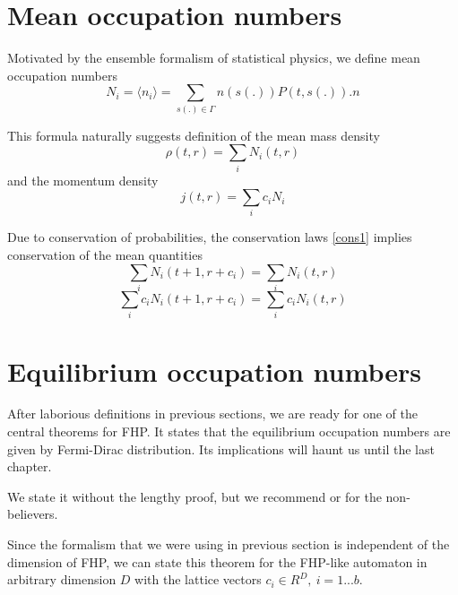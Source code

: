 \section{Mean occupation numbers}
Motivated by the ensemble formalism of statistical physics, we define mean occupation numbers
\begin{equation*}
N_i = \langle n_i \rangle = \sum_{s(.) \in \Gamma} n(s(.)) P(t,s(.)) .n
\end{equation*}

This formula naturally suggests definition of the mean mass density
\begin{equation*}
\rho(t,r) = \sum_i N_i(t,r)
\end{equation*}
and the momentum density
\begin{equation*}
j(t,r) = \sum_i c_i N_i
\end{equation*}

Due to conservation of probabilities, the conservation laws \ref{cons1} implies conservation of the mean quantities
\begin{equation} \label{macro1}
\sum_i N_i(t+1,r+c_i) = \sum_i N_i(t,r) 
\end{equation}
\begin{equation} \label{macro2}
\sum_i c_i N_i(t+1,r+c_i) = \sum_i c_i N_i(t,r)
\end{equation}


\section{Equilibrium occupation numbers}
After laborious definitions in previous sections, we are ready for one of the central theorems for FHP. It states that the equilibrium occupation numbers are given by Fermi-Dirac distribution. Its implications will haunt us until the last chapter.

We state it without the lengthy proof, but we recommend \cite{wolf} or \cite{frisch} for the non-believers.

\bigskip
Since the formalism that we were using in previous section is independent of the dimension of FHP, we can state this theorem for the FHP-like automaton in arbitrary dimension $D$ with the lattice vectors $c_i \in R^D,~i=1...b$.

\bigskip

